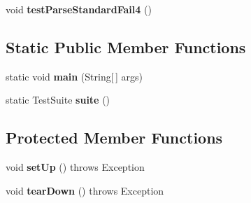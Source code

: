 \begin{DoxyCompactItemize}
\item 
\hypertarget{classorg_1_1joda_1_1time_1_1format_1_1_test_i_s_o_period_format_parsing_a39638ed5af63c43522e8bef891d38843}{void {\bfseries test\-Parse\-Standard\-Fail4} ()}\label{classorg_1_1joda_1_1time_1_1format_1_1_test_i_s_o_period_format_parsing_a39638ed5af63c43522e8bef891d38843}

\end{DoxyCompactItemize}
\subsection*{Static Public Member Functions}
\begin{DoxyCompactItemize}
\item 
\hypertarget{classorg_1_1joda_1_1time_1_1format_1_1_test_i_s_o_period_format_parsing_a07171da2e50c56fa0352851fe3dce4d3}{static void {\bfseries main} (String\mbox{[}$\,$\mbox{]} args)}\label{classorg_1_1joda_1_1time_1_1format_1_1_test_i_s_o_period_format_parsing_a07171da2e50c56fa0352851fe3dce4d3}

\item 
\hypertarget{classorg_1_1joda_1_1time_1_1format_1_1_test_i_s_o_period_format_parsing_a1805ccdd982effb213e5b813438c25e0}{static Test\-Suite {\bfseries suite} ()}\label{classorg_1_1joda_1_1time_1_1format_1_1_test_i_s_o_period_format_parsing_a1805ccdd982effb213e5b813438c25e0}

\end{DoxyCompactItemize}
\subsection*{Protected Member Functions}
\begin{DoxyCompactItemize}
\item 
\hypertarget{classorg_1_1joda_1_1time_1_1format_1_1_test_i_s_o_period_format_parsing_a06e4b093128aab8ba8d2025473666708}{void {\bfseries set\-Up} ()  throws Exception }\label{classorg_1_1joda_1_1time_1_1format_1_1_test_i_s_o_period_format_parsing_a06e4b093128aab8ba8d2025473666708}

\item 
\hypertarget{classorg_1_1joda_1_1time_1_1format_1_1_test_i_s_o_period_format_parsing_a96340c2b881de78d809af0156e1643fb}{void {\bfseries tear\-Down} ()  throws Exception }\label{classorg_1_1joda_1_1time_1_1format_1_1_test_i_s_o_period_format_parsing_a96340c2b881de78d809af0156e1643fb}

\end{DoxyCompactItemize}



